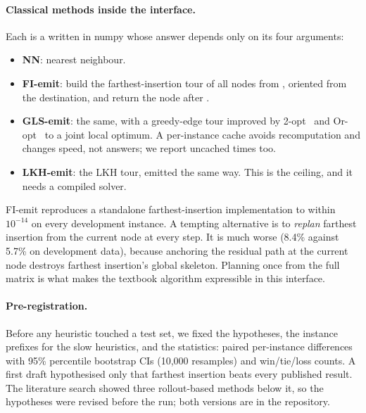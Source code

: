 \paragraph{Classical methods inside the interface.} Each is a  written in numpy whose answer depends only on its four arguments:
\begin{itemize}
\item \textbf{NN}: nearest neighbour.
\item \textbf{FI-emit}: build the farthest-insertion tour of all nodes from ,
oriented from the destination, and return the node after .
\item \textbf{GLS-emit}: the same, with a greedy-edge tour improved by 2-opt~\cite{croes} and
Or-opt~\cite{or} to a joint local optimum. A per-instance cache avoids recomputation and changes speed, not answers; we report uncached times too.
\item \textbf{LKH-emit}: the LKH tour, emitted the same way. This is the ceiling, and it needs a
compiled solver.
\end{itemize}
FI-emit reproduces a standalone farthest-insertion implementation to within $10^{-14}$ on every development instance. A tempting alternative is to \emph{replan} farthest insertion from the current
node at every step. It is much worse (8.4\% against 5.7\% on development data), because anchoring
the residual path at the current node destroys farthest insertion's global skeleton. Planning once
from the full matrix is what makes the textbook algorithm expressible in this interface.

\paragraph{Pre-registration.} Before any heuristic touched a test set, we fixed the hypotheses, the
instance prefixes for the slow heuristics, and the statistics: paired per-instance differences with
95\% percentile bootstrap CIs (10,000 resamples) and win/tie/loss counts. A first draft hypothesised
only that farthest insertion beats every published result. The literature search showed three
rollout-based methods below it, so the hypotheses were revised before the run; both versions are in
the repository.
